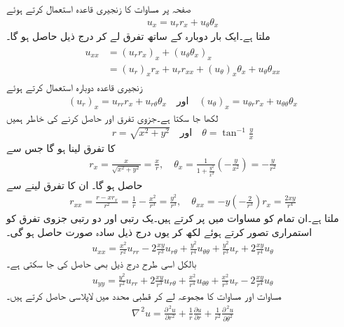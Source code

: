 صفحہ   پر مساوات  کا زنجیری قاعدہ استعمال کرتے ہوئے
\begin{align*}
u_x=u_r r_x+u_{\theta}\theta_x
\end{align*}
ملتا ہے۔ایک بار دوبارہ  کے ساتھ تفرق لے کر درج ذیل حاصل ہو گا۔
\begin{gather}
\begin{aligned}\label{مساوات_جزوی_لاپلاسی__رکن_الف}
u_{xx}&=(u_r r_x)_x+(u_{\theta}\theta_x)_x\\
&=(u_r)_xr_x+u_rr_{xx}+(u_{\theta})_x\theta_x+u_{\theta}\theta_{xx}
\end{aligned}
\end{gather}
زنجیری قاعدہ دوبارہ استعمال کرتے ہوئے
\begin{align*}
(u_r)_x=u_{rr}r_x+u_{r\theta}\theta_x\quad \text{اور}\quad (u_{\theta})_x=u_{\theta r}r_x+u_{\theta \theta} \theta_x
\end{align*}
لکھا جا سکتا ہے۔جزوی تفرق  اور  حاصل کرنے کی خاطر ہمیں
\begin{align*}
r=\sqrt{x^2+y^2}\quad \text{اور}\quad \theta=\tan^{-1}\frac{y}{x}
\end{align*}
کا تفرق لینا ہو گا جس سے 
\begin{align*}
r_x=\frac{x}{\sqrt{x^2+y^2}}=\frac{x}{r}, \quad \theta_x=\frac{1}{1+\frac{y^2}{x^2}}\left(-\frac{y}{x^2}\right)=-\frac{y}{r^2}
\end{align*}
حاصل ہو گا۔ ان کا  تفرق لینے سے
\begin{align*}
r_{xx}=\frac{r-xr_x}{r^2}=\frac{1}{r}-\frac{x^2}{r^3}=\frac{y^2}{r^3},\quad \theta_{xx}=-y\left(-\frac{2}{r^3}\right)r_x=\frac{2xy}{r^4}
\end{align*}
ملتا ہے۔ان تمام کو مساوات  میں پر کرتے ہیں۔یک رتبی اور دو رتبی جزوی تفرق کو استمراری تصور کرتے ہوئے  لکھ کر یوں درج ذیل سادہ صورت حاصل ہو گی۔
 \begin{align}\label{مساوات_جزوی_لاپلاسی__رکن_ب}
u_{xx}=\frac{x^2}{r^2}u_{rr}-2\frac{xy}{r^3}u_{r\theta}+\frac{y^2}{r^4}u_{\theta\theta}+\frac{y^2}{r^3}u_r+2\frac{xy}{r^4}u_{\theta}
\end{align}
بالکل اسی طرح درج ذیل بھی حاصل کی جا سکتی ہے۔
\begin{align}\label{مساوات_جزوی_لاپلاسی__رکن_پ}
u_{yy}=\frac{y^2}{r^2}u_{rr}+2\frac{xy}{r^3}u_{r\theta}+\frac{x^2}{r^4}u_{\theta\theta}+\frac{x^2}{r^3}u_r-2\frac{xy}{r^4}u_{\theta}
\end{align}
مساوات  اور مساوات  کا مجموعہ لے کر قطبی محدد میں لاپلاسی حاصل کرتے ہیں۔
\begin{align}\label{مساوات_جزوی_لاپلاسی__رکن_ت}
\nabla^{\,2}u=\frac{\partial^{\,2}u}{\partial r^2}+\frac{1}{r}\frac{\partial u}{\partial r}+\frac{1}{r^2}\frac{\partial^{\,2}u}{\partial \theta^2}
\end{align}

